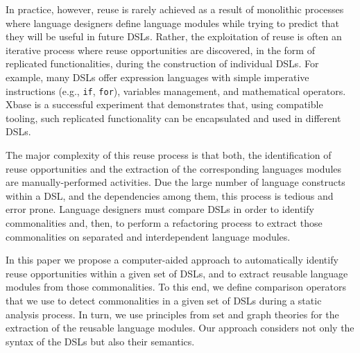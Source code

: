 In practice, however, reuse is rarely achieved as a result of monolithic processes where language designers define language modules while trying to predict that they will be useful in future DSLs. Rather, the exploitation of reuse is often an iterative process where reuse opportunities are discovered, in the form of replicated functionalities, during the construction of individual DSLs. For example, many DSLs offer expression languages with simple imperative instructions (e.g., \texttt{if}, \texttt{for}), variables management, and mathematical operators. Xbase \cite{Bettini:2013} is a successful experiment that demonstrates that, using compatible tooling, such replicated functionality can be encapsulated and used in different DSLs.

The major complexity of this reuse process is that both, the identification of reuse opportunities and the extraction of the corresponding languages modules are manually-performed activities. Due the large number of language constructs within a DSL, and the dependencies among them, this process is tedious and error prone. Language designers must compare DSLs in order to identify commonalities and, then, to perform a refactoring process to extract those commonalities on separated and interdependent language modules. %

In this paper we propose a computer-aided approach to automatically identify reuse opportunities within a given set of DSLs, and to extract reusable language modules from those commonalities. To this end, we define comparison operators that we use to detect commonalities in a given set of DSLs during a static analysis process. In turn, we use principles from set and graph theories for the extraction of the reusable language modules. Our approach considers not only the syntax of the DSLs but also their semantics.


